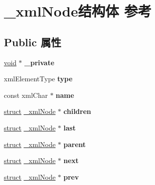 \hypertarget{struct__xml_node}{}\section{\+\_\+xml\+Node结构体 参考}
\label{struct__xml_node}
\subsection*{Public 属性}
\begin{DoxyCompactItemize}
\item 
\mbox{\label{struct__xml_node_a2872be79ee1c9154643d123e96766d4c}} 
\hyperlink{interfacevoid}{void} $\ast$ {\bfseries \+\_\+private}
\item 
\mbox{\label{struct__xml_node_acdcf66240b9c7959ff5ff4221ef725b4}} 
xml\+Element\+Type {\bfseries type}
\item 
\mbox{\label{struct__xml_node_a8629b4d6c8ca0cf48a4104e5546bf06d}} 
const xml\+Char $\ast$ {\bfseries name}
\item 
\mbox{\label{struct__xml_node_a35263b67ca130530ea776e8e3e5f25ae}} 
\hyperlink{interfacestruct}{struct} \hyperlink{struct__xml_node}{\+\_\+xml\+Node} $\ast$ {\bfseries children}
\item 
\mbox{\label{struct__xml_node_ac8f70a320c5a645a77f80d83d690d059}} 
\hyperlink{interfacestruct}{struct} \hyperlink{struct__xml_node}{\+\_\+xml\+Node} $\ast$ {\bfseries last}
\item 
\mbox{\label{struct__xml_node_ad6cfdc4df4af5288af3e5f0ec6eb8f25}} 
\hyperlink{interfacestruct}{struct} \hyperlink{struct__xml_node}{\+\_\+xml\+Node} $\ast$ {\bfseries parent}
\item 
\mbox{\label{struct__xml_node_a3c5c796cc508a8c57f9dfb87326be2c7}} 
\hyperlink{interfacestruct}{struct} \hyperlink{struct__xml_node}{\+\_\+xml\+Node} $\ast$ {\bfseries next}
\item 
\mbox{\label{struct__xml_node_ae6a5ad30b68f25b84c4a2a7baf4d1b2d}} 
\hyperlink{interfacestruct}{struct} \hyperlink{struct__xml_node}{\+\_\+xml\+Node} $\ast$ {\bfseries prev}

\end{DoxyCompactItemize}
